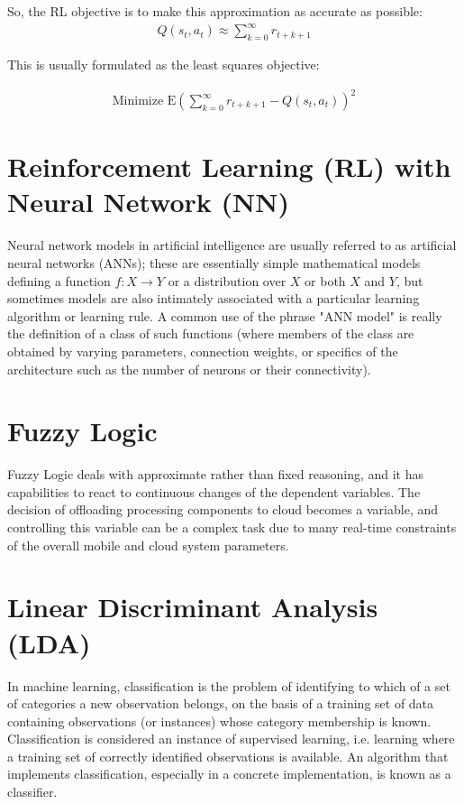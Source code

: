 \documentclass{report}
\begin{document}
So, the RL objective is to make this approximation as accurate as possible:
\begin{align*}
      Q(s_t,a_t) \approx \sum_{k=0}^\infty r_{t+k+1}
\end{align*}

This is usually formulated as the least squares objective:


    \begin{align*}
      \text{Minimize } \mathrm{E} \left ( \sum_{k=0}^\infty r_{t+k+1} - Q(s_t,a_t)\right )^2
    \end{align*}
\section{Reinforcement Learning (RL) with Neural Network (NN)}

Neural network models in artificial intelligence are usually referred to as artificial neural networks (ANNs); these are essentially simple mathematical models defining a function $\textstyle f : X \rightarrow Y $ or a distribution over $\textstyle X $ or both $\textstyle X $ and $\textstyle Y$, but sometimes models are also intimately associated with a particular learning algorithm or learning rule. A common use of the phrase "ANN model" is really the definition of a class of such functions (where members of the class are obtained by varying parameters, connection weights, or specifics of the architecture such as the number of neurons or their connectivity).
\section{Fuzzy Logic}
Fuzzy Logic deals with approximate rather than fixed reasoning, and it has capabilities to react to continuous changes of the dependent variables. The decision of offloading processing components to cloud becomes a variable, and controlling this variable can be a complex task due to many real-time constraints of the overall mobile and cloud system parameters.

\section{Linear Discriminant Analysis (LDA)}
In machine learning, classification is the problem of identifying to which of a set of categories a new observation belongs, on the basis of a training set of data containing observations (or instances) whose category membership is known. Classification is considered an instance of supervised learning, i.e. learning where a training set of correctly identified observations is available.
An algorithm that implements classification, especially in a concrete implementation, is known as a classifier. 
\end{document}
